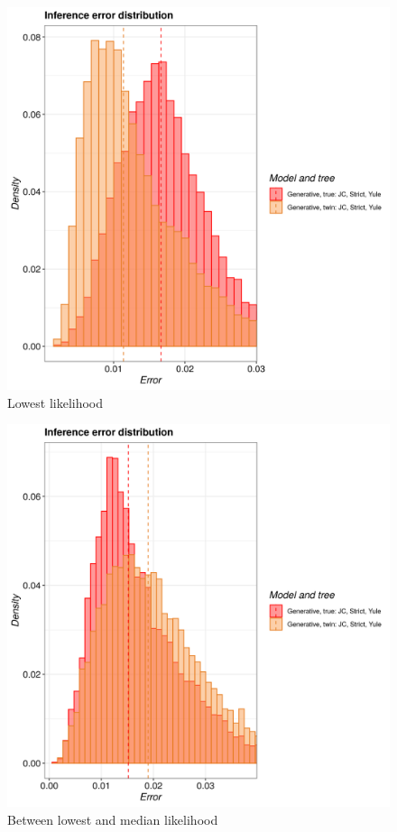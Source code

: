 \begin{figure}[H]
  \includegraphics[width=\textwidth]{pirouette_example_23/example_23_314/errors.png}
  \caption{Lowest likelihood}
\end{figure}

\begin{figure}[H]
  \includegraphics[width=\textwidth]{pirouette_example_23/example_23_315/errors.png}
  \caption{Between lowest and median likelihood}
\end{figure}

